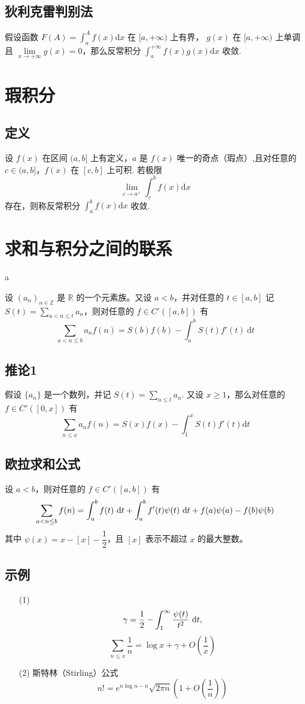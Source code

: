 		\subsection{狄利克雷判别法}
			假设函数 $F(A)=\int_a^Af(x) \text{d} x$ 在 $[a,+\infty)$ 上有界， $g(x)$ 在 $[a,+\infty)$ 上单调且 $\lim\limits_{x\to +\infty}g(x)=0$，那么反常积分 $\int_a^{+\infty}f(x)g(x)\text{d} x$ 收敛.
	\section{瑕积分}
		\subsection{定义}
		 设 $f(x)$ 在区间 $(a,b]$ 上有定义，$a$ 是 $f(x)$ 唯一的奇点（瑕点）,且对任意的 $c \in (a,b]$，$f(x)$ 在 $[c,b]$ 上可积. 若极限 $$\lim\limits_{c\to a^+} \int_c^b f(x) \text{d} x$$ 存在，则称反常积分 $\int_a^b f(x) \text{d} x$ 收敛.
		 
	\section{求和与积分之间的联系}
		\begin{definition}
			a
		\end{definition}
			设 $(a_n)_{n\in \mathbb{Z}}$ 是 $\mathbb{R}$ 的一个元素族。又设 $a<b$，并对任意的 $t \in [a,b]$ 记 $S(t)=\sum\limits_{a<n\le t} a_n$，则对任意的 $f \in C'([a,b])$ 有
			$$\sum\limits_{a<n \le b} a_nf(n)=S(b)f(b)-\int_a^b S(t)f'(t)\  \text{d}t$$
		\subsection{推论1}
			假设 $\{a_n\}$ 是一个数列，并记 $S(t)=\sum\limits_{n\le t}a_n$. 又设 $x \ge 1$，那么对任意的 $f\in C'([0,x])$ 有
			$$\sum\limits_{n\le x} a_nf(n) = S(x)f(x)-\int_1^x S(t)f'(t) \text{d} t$$
		\subsection{欧拉求和公式}
			设 $a<b$，则对任意的 $f\in C'([a,b])$ 有
			$$\sum\limits_{a<n\le b} f(n)=\int_a^b f(t)\  \text d t + \int_a^b f'(t)\psi(t)\  \text d t + f(a)\psi(a)-f(b)\psi(b)$$
			其中 $\psi(x)=x-[x]-\dfrac 1 2$，且 $[x]$ 表示不超过 $x$ 的最大整数。
		\subsection{示例}
			\begin{itemize}[leftmargin=1cm,itemindent=1cm]
				\item[(1)] $$\gamma = \dfrac 1 2 - \int_1^\infty \dfrac{\psi(t)}{t^2}\ \text d t,$$ $$\sum\limits_{n\le x} \dfrac 1 n = \log x +\gamma + O(\dfrac{1}{x})$$
				\item[(2)]斯特林（Stirling）公式 $$n!=e^{n\log n - n}\sqrt{2\pi n}\left(1+O\left(\dfrac 1 n\right)\right)$$
			\end{itemize}